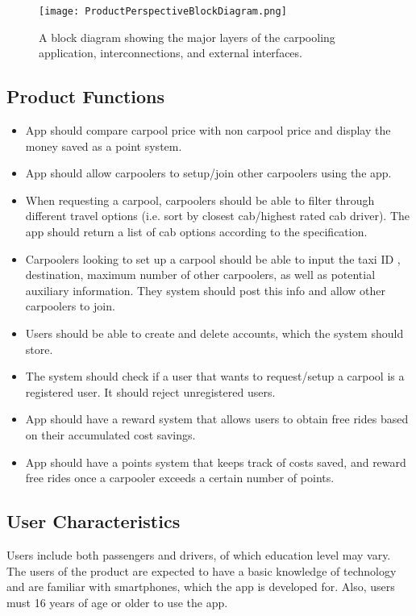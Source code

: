 \documentclass[]{article}
\begin{document}
\begin{figure}[h!]
	\centering
	\texttt{[image: ProductPerspectiveBlockDiagram.png]}
	\caption{A block diagram showing the major layers of the carpooling application, interconnections, and external interfaces.}
	\label{fig:blockdiagram}
\end{figure}

\subsection{Product Functions}
\label{sub:product_functions}
\begin{itemize}
	\item App should compare carpool price with non carpool price and display the money saved as a point system.
	\item App should allow carpoolers to setup/join other carpoolers using the app.
	\item When requesting a carpool, carpoolers should be able to filter through different travel options (i.e. sort by closest cab/highest rated cab driver). The app should return a list of cab options according to the specification.
	\item Carpoolers looking to set up a carpool should be able to input the taxi ID , destination, maximum number of other carpoolers, as well as potential auxiliary information. They system should post this info and allow other carpoolers to join.
	\item Users should be able to create and delete accounts, which the system should store.
	\item The system should check if a user that wants to request/setup a carpool is a registered user. It should reject unregistered users.
	\item App should have a reward system that allows users to obtain free rides based on their accumulated cost savings.
	\item App should have a points system that keeps track of costs saved, and reward free rides once a carpooler exceeds a certain number of points.
\end{itemize}

\subsection{User Characteristics}
\label{sub:user_characteristics}
Users include both passengers and drivers, of which education level may vary. The users of the product are expected to have a basic knowledge of technology and are familiar with smartphones, which the app is developed for. Also, users must 16 years of age or older to use the app.
\end{document}
